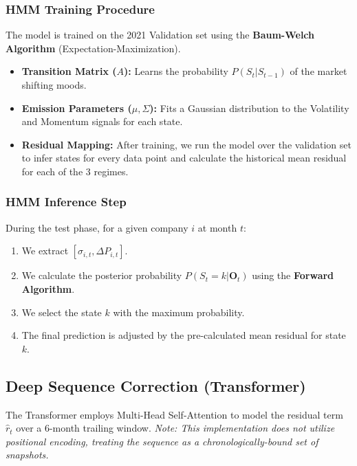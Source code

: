 \documentclass[11pt]{article}
\begin{document}
\subsubsection{HMM Training Procedure}
The model is trained on the 2021 Validation set using the \textbf{Baum-Welch Algorithm} (Expectation-Maximization). 
\begin{itemize}
    \item \textbf{Transition Matrix ($A$):} Learns the probability $P(S_t | S_{t-1})$ of the market shifting moods.
    \item \textbf{Emission Parameters ($\mu, \Sigma$):} Fits a Gaussian distribution to the Volatility and Momentum signals for each state.
    \item \textbf{Residual Mapping:} After training, we run the model over the validation set to infer states for every data point and calculate the historical mean residual for each of the 3 regimes.
\end{itemize}

\subsubsection{HMM Inference Step}
During the test phase, for a given company $i$ at month $t$:
\begin{enumerate}
    \item We extract $[\sigma_{i,t}, \Delta P_{i,t}]$.
    \item We calculate the posterior probability $P(S_t = k | \mathbf{O}_t)$ using the \textbf{Forward Algorithm}.
    \item We select the state $k$ with the maximum probability.
    \item The final prediction is adjusted by the pre-calculated mean residual for state $k$.
\end{enumerate}

\subsection{Deep Sequence Correction (Transformer)}
The Transformer employs Multi-Head Self-Attention to model the residual term $\hat{r}_t$ over a 6-month trailing window. \textit{Note: This implementation does not utilize positional encoding, treating the sequence as a chronologically-bound set of snapshots.}
\end{document}
